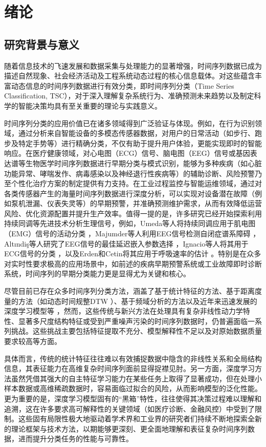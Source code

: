 \section{绪论}
\subsection{研究背景与意义}
随着信息技术的飞速发展和数据采集与处理能力的显著增强，时间序列数据已成为描述自然现象、社会经济活动及工程系统动态过程的核心信息载体。对这些蕴含丰富动态信息的时间序列数据进行有效分类，即时间序列分类（Time Series Classification, TSC），对于深入理解复杂系统行为、准确预测未来趋势以及制定科学的智能决策均具有至关重要的理论与实践意义。

时间序列分类的应用价值已在诸多领域得到广泛验证与体现。例如，在行为识别领域，通过分析来自智能设备的多模态传感器数据，对用户的日常活动（如步行、跑步及特定手势等）进行精确分类，不仅有助于提升用户体验，更能实现即时的智能响应。在医疗健康领域，对心电图（ECG）信号、脑电图（EEG）信号或基因表达谱等生物医学时间序列数据进行早期分类与模式识别，能够为多种疾病（如心脏功能异常、哮喘发作、病毒感染以及神经退行性疾病等）的辅助诊断、风险预警乃至个性化治疗方案的制定提供有力支持。在工业过程监控与智能运维领域，通过对各类传感器产生的海量时间序列数据进行深度分析，可以实现对设备潜在故障（例如泵机泄漏、仪表失灵等）的早期预警，并准确预测维护需求，从而有效降低运营风险、优化资源配置并提升生产效率。值得一提的是，许多研究已经开始探索利用持续同调等先进技术分析生理信号，例如，Umeda等人将持续同调应用于肌电图（EMG）信号的活动分类 \cite{umeda2017time}，Majumder等人利用EEG信号检测自闭症谱系障碍 \cite{majumder2020detecting}，Altındiş等人研究了EEG信号的最佳延迟嵌入参数选择 \cite{altindics2021parameter}，Ignacio等人将其用于ECG信号的分类 \cite{ignacio2019classification}，以及Erden和Cetin将其应用于呼吸速率的估计 \cite{erden2017period}。特别是在众多对实时性要求极高的应用场景中，如前述的疾病早期预警系统或工业故障即时诊断系统，时间序列的早期分类能力更是显得尤为关键和核心。

尽管目前已存在众多时间序列分类方法，涵盖了基于统计特征的方法、基于距离度量的方法（如动态时间规整DTW \cite{rakthanmanon2012searching}）、基于频域分析的方法以及近年来迅速发展的深度学习模型等 \cite{altun2010human,1024896851.nh}，然而，这些传统与新兴方法在处理具有复杂非线性动力学特性、显著多尺度结构特征或受到严重噪声污染的时间序列数据时，仍普遍面临一系列挑战。这些挑战主要包括特征提取不充分、模型解释性不足以及对原始数据质量要求较高等方面。

具体而言，传统的统计特征往往难以有效捕捉数据中隐含的非线性关系和全局结构信息，其表征能力在高维复杂时间序列面前显得捉襟见肘。另一方面，深度学习方法虽然凭借其强大的自主特征学习能力在某些任务上取得了显著成功，但在处理小样本数据或高维稀疏数据时，容易面临过拟合的风险，从而影响模型的泛化性能。更为重要的是，深度学习模型固有的“黑箱”特性，往往使得其决策过程难以理解和追溯，这在许多要求高可解释性的关键领域（如医疗诊断、金融风控）中受到了限制。这些固有局限性极大地驱动着学术界和工业界的研究者们持续不断地探索全新的理论框架与技术方法，以期能够更深刻、更全面地理解和表征复杂时间序列数据，进而提升分类任务的性能与可靠性。

